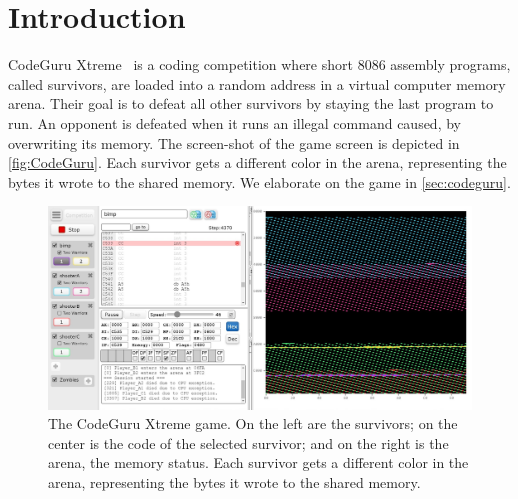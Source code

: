 \documentclass[dvipsnames, format=sigconf]{acmart}
\begin{document}
\maketitle

\section{Introduction}
CodeGuru Xtreme~\cite{codeguru_repo} is a coding competition where short 8086 assembly programs, called survivors, are loaded into a random address in a virtual computer memory arena. Their goal is to defeat all other survivors by staying the last program to run. An opponent is defeated when it runs an illegal command caused, \eg by overwriting its memory. The screen-shot of the game screen is depicted in \autoref{fig:CodeGuru}. Each survivor gets a different color in the arena, representing the bytes it wrote to the shared memory. We elaborate on the game in \autoref{sec:codeguru}.

\begin{figure}
  \centering
\includegraphics[width=\linewidth]{images/memory_use.jpg} 
  \caption{The CodeGuru Xtreme game. On the left are the survivors; on the center is the code of the selected survivor; and on the right is the arena, \ie the memory status. Each survivor gets a different color in the arena, representing the bytes it wrote to the shared memory.}
  \label{fig:CodeGuru}
\end{figure}
\end{document}
